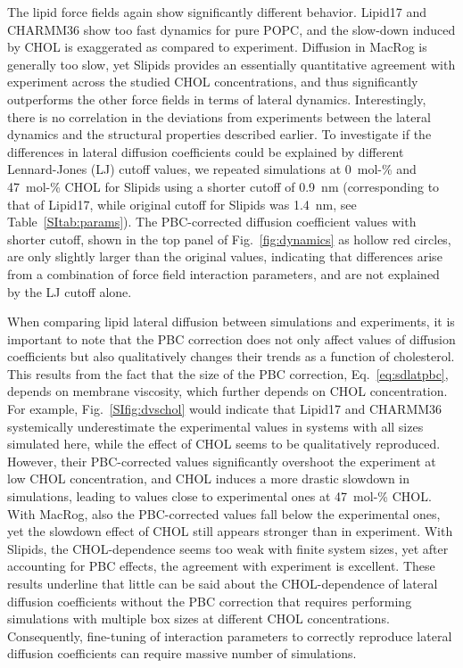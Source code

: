 \documentclass[journal=jctcce]{achemso}
\begin{document}
The lipid force fields again show significantly different behavior. Lipid17 and CHARMM36 show too fast dynamics for pure POPC, and the slow-down induced by CHOL is exaggerated as compared to experiment. Diffusion in MacRog is generally too slow, yet Slipids provides an essentially quantitative agreement with experiment across the studied CHOL concentrations, and thus significantly outperforms the other force fields in terms of lateral dynamics. Interestingly, there is no correlation in the deviations from experiments between the lateral dynamics and the structural properties described earlier. To investigate if the differences in lateral diffusion coefficients could be explained by different Lennard-Jones (LJ) cutoff values, we repeated simulations at 0~mol-\% and 47~mol-\% CHOL for Slipids using a shorter cutoff of 0.9~nm (corresponding to that of Lipid17, while original cutoff for Slipids was 1.4~nm, see Table~\ref{SItab:params}). The PBC-corrected diffusion coefficient values with shorter cutoff, shown in the top panel of Fig.~\ref{fig:dynamics} as hollow red circles, are only slightly larger than the original values, indicating that differences arise from a combination of force field interaction parameters, and are not explained by the LJ cutoff alone.

When comparing lipid lateral diffusion between simulations and experiments, it is important to note that the PBC correction does not only affect values of diffusion coefficients but also qualitatively changes their trends as a function of cholesterol. This results from the fact that the size of the PBC correction, Eq.~\eqref{eq:sdlatpbc}, depends on membrane viscosity, which further depends on CHOL concentration. For example, Fig.~\ref{SIfig:dvschol} would indicate that Lipid17 and CHARMM36 systemically underestimate the experimental values in systems with all sizes simulated here, while the effect of CHOL seems to be qualitatively reproduced. However, their PBC-corrected values significantly overshoot the experiment at low CHOL concentration, and CHOL induces a more drastic slowdown in simulations, leading to values close to experimental ones at 47~mol-\% CHOL. With MacRog, also the PBC-corrected values fall below the experimental ones, yet the slowdown effect of CHOL still appears stronger than in experiment. With Slipids, the CHOL-dependence seems too weak with finite system sizes, yet after accounting for PBC effects, the agreement with experiment is excellent. These results underline that little can be said about the CHOL-dependence of lateral diffusion coefficients without the PBC correction that requires performing simulations with multiple box sizes at different CHOL concentrations. Consequently, fine-tuning of interaction parameters to correctly reproduce lateral diffusion coefficients can require massive number of simulations.
\end{document}
